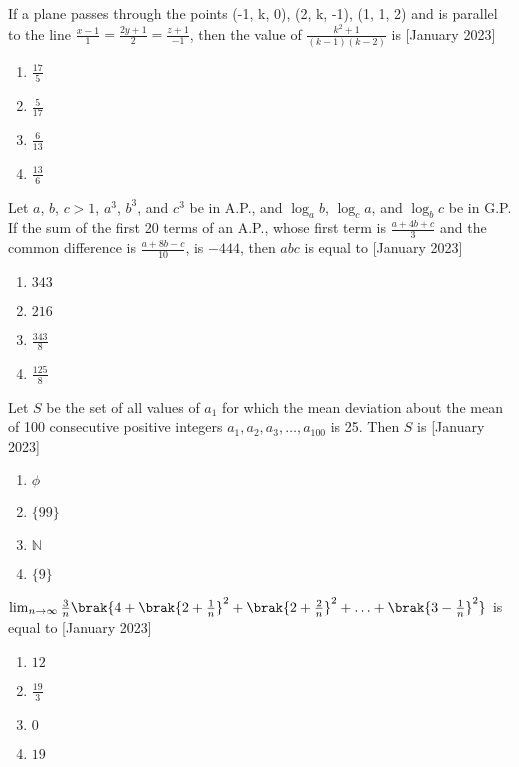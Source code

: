 \iffalse
\title{2023}
\author{AI24BTECH11012}
\section{mcq-single}
\fi
    \item If a plane passes through the points (-1, k, 0), (2, k, -1), (1, 1, 2) and is parallel to the line $\frac{x-1}{1} = \frac{2y+1}{2} = \frac{z+1}{-1}$, then the value of $\frac{k^2+1}{(k-1)(k-2)}$ is
    \hfill{[January 2023]}
    \begin{enumerate}
        \item $\frac{17}{5}$
        \item $\frac{5}{17}$
        \item $\frac{6}{13}$
        \item $\frac{13}{6}$
    \end{enumerate}
    
    \item Let $a$, $b$, $c > 1$, $a^3$, $b^3$, and $c^3$ be in A.P., and $\log_ab$, $\log_ca$, and $\log_bc$ be in G.P. If the sum of the first 20 terms of an A.P., whose first term is $\frac{a+4b+c}{3}$ and the common difference is $\frac{a+8b-c}{10}$, is $-444$, then $abc$ is equal to
    \hfill{[January 2023]}
    \begin{enumerate}
        \item $343$
        \item $216$
        \item $\frac{343}{8}$
        \item $\frac{125}{8}$
    \end{enumerate}

    \item Let $S$ be the set of all values of $a_1$ for which the mean deviation about the mean of 100 consecutive positive integers $a_1, a_2, a_3, \dots, a_{100}$ is 25. Then $S$ is
    \hfill{[January 2023]}
    \begin{enumerate}
        \item $\phi$
        \item $\{99\}$
        \item $\mathbb{N}$
        \item $\{9\}$
    \end{enumerate}

    \item $\lim_{n \to \infty} \frac{3}{n}\brak{4+\brak{2+\frac{1}{n}}^2+\brak{2+\frac{2}{n}}^2 + \ldots + \brak{3-\frac{1}{n}}^2}$ is equal to
    \hfill{[January 2023]}
    \begin{enumerate}
        \item $12$
        \item $\frac{19}{3}$
        \item $0$
        \item $19$
    \end{enumerate}


